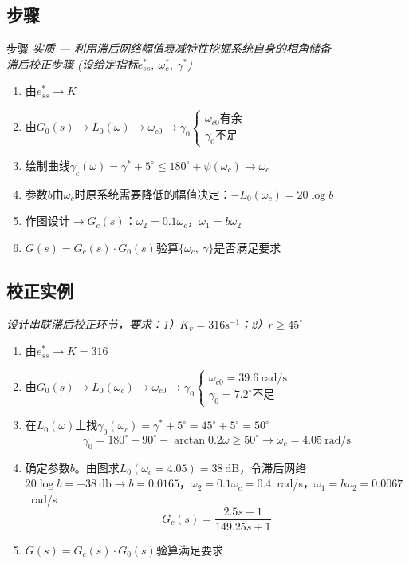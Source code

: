 \documentclass[handout,cjkutf8,table,aspectratio=1610]{beamer} %
\begin{document}
\subsection{步骤}
\begin{frame}{步骤}
	\emph{\color{red}实质 — 利用滞后网络幅值衰减特性挖掘系统自身的相角储备}\\
	\emph{滞后校正步骤 (设给定指标$e_{ss}^*,~\omega_c^*,~\gamma^*$)}
	\begin{enumerate}[(1)]
		\item 由$e_{ss}^*\rightarrow K$
		\item 由$G_0(s)\rightarrow L_0(\omega)\rightarrow \omega_{c0}\rightarrow\gamma_0\begin{cases}\omega_{c0}\text{有余}\\ \gamma_0\text{不足}\end{cases}$
		\item 绘制曲线$\gamma_c(\omega) = \gamma^* + 5^\circ \le180^\circ+\psi(\omega_c) \rightarrow \omega_c$
		\item 参数$b$由$\omega_c$时原系统需要降低的幅值决定：$-L_0(\omega_c)=20\log b$
		\item 作图设计$\rightarrow G_c(s)$：$\omega_2=0.1\omega_c$，$\omega_1=b\omega_2$
		\item $G(s) = G_c(s)\cdot G_0(s)$验算$\{\omega_c,~\gamma\}$是否满足要求
	\end{enumerate}
\end{frame}

\subsection{校正实例}
\begin{frame}{}
	\emph{设计串联滞后校正环节，要求：1）$K_v = 316\text{s}^{-1}$；2）$r \ge 45^\circ$}
	\begin{enumerate}[(1)]
		\item 由$e_{ss}^*\rightarrow K =316$
		\item 由$G_0(s)\rightarrow L_0(\omega_c)\rightarrow \omega_{c0}\rightarrow \gamma_0\begin{cases}\omega_{c0}=39.6~\text{rad/s}\\ \gamma_0=7.2^\circ\text{不足}\end{cases}$
		\item 在$L_0(\omega)$上找$\gamma_0(\omega_c)=\gamma^* + 5^\circ=45^\circ+5^\circ = 50^\circ$
		$$\gamma_0 = 180^\circ - 90^\circ - \arctan0.2\omega \ge 50^\circ \rightarrow \omega_c = 4.05~\text{rad/s}$$
		\item 确定参数$b$。由图求$L_0(\omega_c=4.05)=38~\text{dB}$，令滞后网络$20\log b=-38~\text{db}\rightarrow b=0.0165$，$\omega_2=0.1\omega_c=0.4$~rad/s，$\omega_1 = b\omega_2 = 0.0067$~rad/s
		$$G_c(s) = \frac{2.5s+1}{149.25s+1}$$
		\item $G(s) = G_c(s)\cdot G_0(s)$验算满足要求
	\end{enumerate}
\end{frame}
\end{document}
